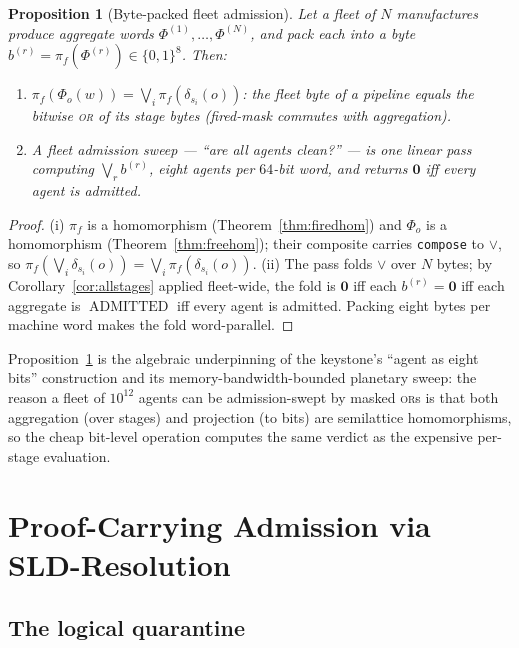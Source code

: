 \documentclass[11pt,oneside]{book}
\theoremstyle{definition}
\theoremstyle{plain}
\newtheorem{proposition}[theorem]{Proposition}
\theoremstyle{remark}
\newcommand{\code}[1]{\texttt{#1}}
\newcommand{\Adml}{\operatorname{ADMITTED}}          %
\newcommand{\firedmap}{\pi_{f}}                %
\begin{document}
\begin{proposition}[Byte-packed fleet admission]\label{prop:fleet}
Let a fleet of $N$ manufactures produce aggregate words $\Phi^{(1)},\dots,\Phi^{(N)}$, and pack each into a byte $b^{(r)}=\firedmap(\Phi^{(r)})\in\{0,1\}^{8}$. %
Then:
\begin{enumerate}[label=(\roman*),leftmargin=*]
\item $\firedmap(\Phi_o(w))=\bigvee_{i}\firedmap(\delta_{s_i}(o))$: the fleet byte of a pipeline equals the bitwise \textsc{or} of its stage bytes (fired-mask commutes with aggregation). %
\item A fleet admission sweep --- ``are all agents clean?'' --- is one linear pass computing $\bigvee_r b^{(r)}$, eight agents per $64$-bit word, and returns $\bm 0$ iff every agent is admitted. %
\end{enumerate}
\end{proposition}

\begin{proof}
(i) $\firedmap$ is a homomorphism (Theorem~\ref{thm:firedhom}) and $\Phi_o$ is a homomorphism (Theorem~\ref{thm:freehom}); their composite carries \code{compose} to $\lor$, so $\firedmap(\bigvee_i\delta_{s_i}(o))=\bigvee_i\firedmap(\delta_{s_i}(o))$. %
(ii) The pass folds $\lor$ over $N$ bytes; by Corollary~\ref{cor:allstages} applied fleet-wide, the fold is $\bm 0$ iff each $b^{(r)}=\bm 0$ iff each aggregate is $\Adml$ iff every agent is admitted. %
Packing eight bytes per machine word makes the fold word-parallel. %
\end{proof}

Proposition~\ref{prop:fleet} is the algebraic underpinning of the keystone's ``agent as eight bits'' construction and its memory-bandwidth-bounded planetary sweep: the reason a fleet of $10^{12}$ agents can be admission-swept by masked \textsc{or}s is that both aggregation (over stages) and projection (to bits) are semilattice homomorphisms, so the cheap bit-level operation computes the same verdict as the expensive per-stage evaluation. %

\chapter{Proof-Carrying Admission via SLD-Resolution}
\label{ch:proof}

\section{The logical quarantine}
\end{document}
